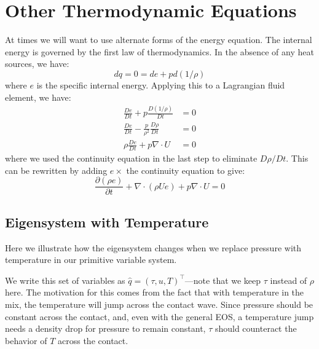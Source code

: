 \section{Other Thermodynamic Equations}

At times we will want to use alternate forms of the energy equation.  The
internal energy is governed by the first law of thermodynamics.  In the
absence of any heat sources, we have:
\begin{equation}
dq = 0 = de + pd(1/\rho)
\end{equation}
where $e$ is the specific internal energy.
Applying this to a Lagrangian fluid element, we have:
\begin{align}
\frac{De}{Dt} + p \frac{D(1/\rho)}{Dt} &= 0 \\
\frac{De}{Dt} - \frac{p}{\rho^2} \frac{D\rho}{Dt} &= 0 \\
\rho \frac{De}{Dt} + p \nabla \cdot U &= 0
\end{align}
where we used the continuity equation in the last step to eliminate
$D\rho/Dt$.  This can be rewritten by adding $e \times$ the continuity
equation to give:
\begin{equation}
\frac{\partial (\rho e)}{\partial t} + \nabla \cdot (\rho U e) + p \nabla \cdot U = 0 \label{eq:euler:econs}
\end{equation}


\subsection{Eigensystem with Temperature}

Here we illustrate how the eigensystem changes when we replace pressure with
temperature in our primitive variable system.

We write this set of variables as $\hat{q} = (\tau, u,
T)^\intercal$---note that we keep $\tau$ instead of $\rho$ here.  The
motivation for this comes from the fact that with temperature in the
mix, the temperature will jump across the contact wave.  Since
pressure should be constant across the contact, and, even with the
general EOS, a temperature jump needs a density drop for pressure to
remain constant, $\tau$ should counteract the behavior of $T$ across
the contact.

